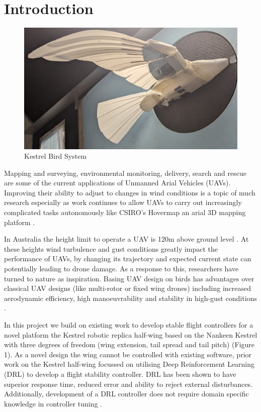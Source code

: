 \section{Introduction}

    \begin{figure}
        \includegraphics[width=\textwidth/2]{./img/Kestrel.jpg}
        \caption{\label{fig:figure 1} Kestrel Bird System}
    \end{figure}

    Mapping and surveying, environmental monitoring, delivery, search and
    rescue are some of the current applications of Unmanned Arial Vehicles
    (UAVs). Improving their ability to adjust to changes in wind conditions
    is a topic of much research \cite{1} especially as work continues to
    allow UAVs to carry out increasingly complicated tasks autonomously
    like CSIRO’s Hovermap an arial 3D mapping platform \cite{2}.

    In Australia the height limit to operate a UAV is 120m above ground
    level \cite{3}. At these heights wind turbulence and gust conditions greatly
    impact the performance of UAVs, by changing its trajectory and expected
    current state can potentially leading to drone damage. As a response to
    this, researchers have turned to nature as inspiration. Basing UAV
    design on birds has advantages over classical UAV designs (like
    multi-rotor or fixed wing drones) including increased aerodynamic
    efficiency, high manoeuvrability and stability in high-gust conditions \cite{4}.

    In this project we build on existing work to develop stable flight
    controllers for a novel platform the Kestrel robotic replica half-wing
    based on the Nankeen Kestrel with three degrees of freedom (wing
    extension, tail spread and tail pitch) \cite{5}
    (Figure 1).
    As a novel design
    the wing cannot be controlled with existing software, prior work on the
    Kestrel half-wing focussed on utilising Deep Reinforcement Learning
    (DRL) to develop a flight stability controller. DRL has been shown
    to have superior response time, reduced error and ability to reject
    external disturbances. Additionally, development of a DRL controller
    does not require domain specific knowledge in controller tuning \cite{6}.

